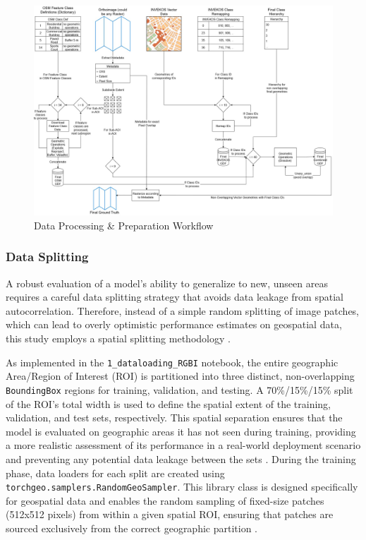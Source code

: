 \documentclass{report}
\begin{document}
\newpage
\begin{figure}
    \includegraphics[width=\textwidth]{own_images/Workflow.jpg}
    \caption{Data Processing \& Preparation Workflow}
    \label{fig:data_processing_workflow}
\end{figure}


\subsubsection{Data Splitting}
A robust evaluation of a model's ability to generalize to new, unseen areas requires a careful data splitting strategy that avoids data leakage from spatial autocorrelation. Therefore, instead of a simple random splitting of image patches, which can lead to overly optimistic performance estimates on geospatial data, this study employs a spatial splitting methodology \parencites[p.~1ff.]{FengEtAlInformationLeakageDeepLearningBasedHyperspectralImageClassificationSurvey2023}[]{StewartEtAlTorchGeoDeepLearningGeospatialData2024}.

As implemented in the \texttt{1\_dataloading\_RGBI} notebook, the entire geographic Area/Region of Interest (ROI) is partitioned into three distinct, non-overlapping \texttt{BoundingBox} regions for training, validation, and testing. A 70\%/15\%/15\% split of the ROI's total width is used to define the spatial extent of the training, validation, and test sets, respectively. This spatial separation ensures that the model is evaluated on geographic areas it has not seen during training, providing a more realistic assessment of its performance in a real-world deployment scenario and preventing any potential data leakage between the sets \parencite[p.~3.]{FengEtAlInformationLeakageDeepLearningBasedHyperspectralImageClassificationSurvey2023}. During the training phase, data loaders for each split are created using \texttt{torchgeo.samplers.RandomGeoSampler}. This library class is designed specifically for geospatial data and enables the random sampling of fixed-size patches (512x512 pixels) from within a given spatial ROI, ensuring that patches are sourced exclusively from the correct geographic partition \parencite{StewartEtAlTorchGeoDeepLearningGeospatialData2024}.
\end{document}
